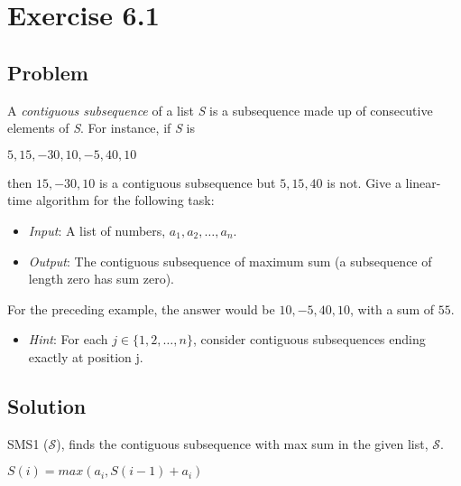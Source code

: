 \documentclass[12pt, letterpaper]{article}
\begin{document}
\section{Exercise 6.1}

\subsection{Problem}

A \textit{contiguous subsequence} of a list \textit{S} is a subsequence made up of consecutive elements of \textit{S}. For instance, if \textit{S} is 
\begin{center}
\(5, 15, -30, 10, -5, 40, 10\)
\end{center}
then \(15, -30, 10\) is a contiguous subsequence but \(5, 15, 40\) is not. Give a linear-time algorithm for the following task:
\begin{center}
\begin{itemize}
    \item[] \textit{Input}: A list of numbers, \({a_1}, {a_2},\dots,{a_n}\).
    \item[] \textit{Output}: The contiguous subsequence of maximum sum (a subsequence of length zero has sum zero).
\end{itemize}
\end{center}
For the preceding example, the answer would be \(10, -5, 40, 10\), with a sum of \(55\).
\begin{center}
\begin{itemize}
    \item[] \textit{Hint}: For each \(j\in\{1,2,\dots,n\}\), consider contiguous subsequences ending exactly at position j.
\end{itemize}
\end{center}

\subsection{Solution}

\begin{algorithm}
    \captionsetup{labelsep=newline}
    \caption{SMS1 (\(\mathcal{S}\)), finds the contiguous subsequence with max sum in the given list, \(\mathcal{S}\).}

    {
        \(S(i) = max(a_i, S(i-1) + a_i)\)
    }
\end{algorithm}
\end{document}
